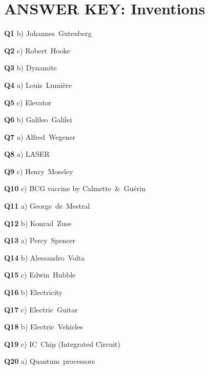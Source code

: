 \section{ANSWER KEY: Inventions}

\textbf{Q1} b) Johannes Gutenberg\par
\textbf{Q2} c) Robert Hooke\par
\textbf{Q3} b) Dynamite\par
\textbf{Q4} a) Louis Lumière\par
\textbf{Q5} c) Elevator\par
\textbf{Q6} b) Galileo Galilei\par
\textbf{Q7} a) Alfred Wegener\par
\textbf{Q8} a) LASER\par
\textbf{Q9} c) Henry Moseley\par
\textbf{Q10} c) BCG vaccine by Calmette & Guérin\par
\textbf{Q11} a) George de Mestral\par
\textbf{Q12} b) Konrad Zuse\par
\textbf{Q13} a) Percy Spencer\par
\textbf{Q14} b) Alessandro Volta\par
\textbf{Q15} c) Edwin Hubble\par
\textbf{Q16} b) Electricity\par
\textbf{Q17} c) Electric Guitar\par
\textbf{Q18} b) Electric Vehicles\par
\textbf{Q19} c) IC Chip (Integrated Circuit)\par
\textbf{Q20} a) Quantum processors\par